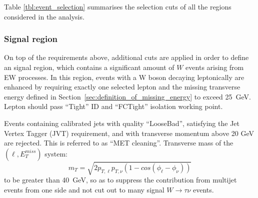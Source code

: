 Table \ref{tbl:event_selection} summarises the selection cuts of all the regions considered in the analysis.

\subsubsection{Signal region}
\label{sec:w_boson_selection}


On top of the requirements above, additional cuts are applied in order to define an signal region, which contains a significant amount of $W$ events arising from EW processes.
In this region, events with a W boson decaying leptonically are enhanced by requiring exactly one selected lepton and the missing transverse energy defined in Section~\ref{sec:definition_of_missing_energy} to exceed 25~GeV.
Lepton should pass ``Tight'' ID and ``FCTight'' isolation working point.

Events containing calibrated jets with quality ``LooseBad'', satisfying the Jet Vertex Tagger (JVT) requirement, and with transverse momentum above 20 GeV are rejected. 
This is referred to as “MET cleaning”. 
Transverse mass of the $(\ell,E_{T}^{miss})$ system:
\begin{equation}
  \label{eq:mT_W}
  m_{T} = \sqrt{2 p_{T,\ell} p_{T,\nu} (1-cos(\phi_{\ell} - \phi_{\nu} )) }
\end{equation}
to be greater than 40~GeV, so as to suppress the contribution from multijet events from one side and not cut out to many signal $W\rightarrow\tau\nu$ events.

